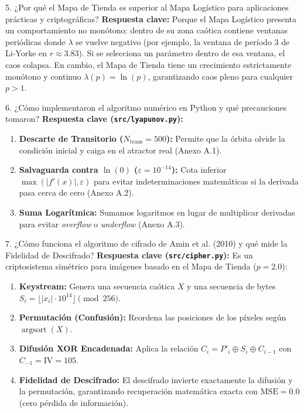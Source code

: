 \documentclass[11pt,letterpaper]{article}
\begin{document}
\begin{pregunta}{5. ¿Por qué el Mapa de Tienda es superior al Mapa Logístico para aplicaciones prácticas y criptográficas?}
\textbf{Respuesta clave:}  
Porque el Mapa Logístico presenta un comportamiento no monótono: dentro de su zona caótica contiene ventanas periódicas donde $\lambda$ se vuelve negativo (por ejemplo, la ventana de período 3 de Li-Yorke en $r \approx 3.83$). Si se selecciona un parámetro dentro de esa ventana, el caos colapsa. En cambio, el Mapa de Tienda tiene un crecimiento estrictamente monótono y continuo $\lambda(p) = \ln(p)$, garantizando caos pleno para cualquier $p > 1$.
\end{pregunta}

\begin{pregunta}{6. ¿Cómo implementaron el algoritmo numérico en Python y qué precauciones tomaron?}
\textbf{Respuesta clave (\texttt{src/lyapunov.py}):}  
\begin{enumerate}
    \item \textbf{Descarte de Transitorio ($N_{\text{trans}} = 500$):} Permite que la órbita olvide la condición inicial y caiga en el atractor real (Anexo A.1).
    \item \textbf{Salvaguarda contra $\ln(0)$ ($\varepsilon = 10^{-14}$):} Cota inferior $\max(|f'(x)|, \varepsilon)$ para evitar indeterminaciones matemáticas si la derivada pasa cerca de cero (Anexo A.2).
    \item \textbf{Suma Logarítmica:} Sumamos logaritmos en lugar de multiplicar derivadas para evitar \textit{overflow} o \textit{underflow} (Anexo A.3).
\end{enumerate}
\end{pregunta}

\begin{pregunta}{7. ¿Cómo funciona el algoritmo de cifrado de Amin et al. (2010) y qué mide la Fidelidad de Descifrado?}
\textbf{Respuesta clave (\texttt{src/cipher.py}):}  
Es un criptosistema simétrico para imágenes basado en el Mapa de Tienda ($p=2.0$):
\begin{enumerate}
    \item \textbf{Keystream:} Genera una secuencia caótica $X$ y una secuencia de bytes $S_i = \lfloor |x_i| \cdot 10^{14} \rfloor \pmod{256}$.
    \item \textbf{Permutación (Confusión):} Reordena las posiciones de los píxeles según $\operatorname{argsort}(X)$.
    \item \textbf{Difusión XOR Encadenada:} Aplica la relación $C_i = P'_i \oplus S_i \oplus C_{i-1}$ con $C_{-1} = \text{IV} = 105$.
    \item \textbf{Fidelidad de Descifrado:} El descifrado invierte exactamente la difusión y la permutación, garantizando recuperación matemática exacta con $\text{MSE} = 0.0$ (cero pérdida de información).
\end{enumerate}
\end{pregunta}
\end{document}
